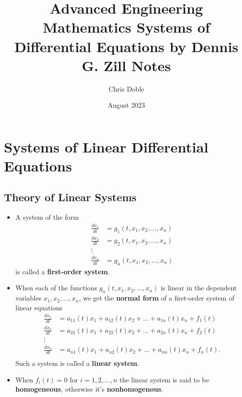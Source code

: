 \documentclass{article}
\title{Advanced Engineering Mathematics Systems of Differential Equations by Dennis G. Zill Notes}
\author{Chris Doble}
\date{August 2023}
\begin{document}
\maketitle

\tableofcontents

\setcounter{section}{9}
\section{Systems of Linear Differential Equations}

\subsection{Theory of Linear Systems}

\begin{itemize}
  \item A system of the form \begin{align*}
          \frac{d x_1}{d t} & = g_1(t, x_1, x_2, \ldots, x_n) \\
          \frac{d x_2}{d t} & = g_2(t, x_1, x_2, \ldots, x_n) \\
          \vdots                                              \\
          \frac{d x_n}{d t} & = g_n(t, x_1, x_2, \ldots, x_n)
        \end{align*} is called a \textbf{first-order system}.

  \item When each of the functions $g_n(t, x_1, x_2, \ldots, x_n)$ is linear in the dependent variables $x_1, x_2, \ldots, x_n$, we get the \textbf{normal form} of a first-order system of linear equations \begin{align*}
          \frac{d x_1}{d t} & = a_{11}(t) x_1 + a_{12}(t) x_2 + \ldots + a_{1n}(t) x_n + f_1(t)  \\
          \frac{d x_2}{d t} & = a_{21}(t) x_1 + a_{22}(t) x_2 + \ldots + a_{2n}(t) x_n + f_2(t)  \\
          \vdots                                                                                 \\
          \frac{d x_n}{d t} & = a_{n1}(t) x_1 + a_{n2}(t) x_2 + \ldots + a_{nn}(t) x_n + f_n(t). \\
        \end{align*} Such a system is called a \textbf{linear system}.

  \item When $f_i(t) = 0$ for $i = 1, 2, \ldots, n$ the linear system is said to be \textbf{homogeneous}, otherwise it's \textbf{nonhomogenous}.


\end{itemize}
\end{document}
